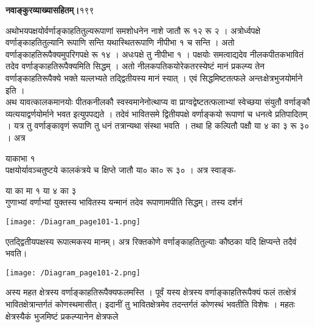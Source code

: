 \documentclass[11pt, openany]{book}
\begin{document}
\onehalfspacing
\hspace{2in}\textbf{नवाङ्कुरव्याख्यासहितम्।}\hspace{2in}१९९ 

\vspace{5mm}
\begin{sloppypar}
\hangindent=0.2in \hspace{0.2in}अथोभयपक्षयोर्वर्णाङ्काहतितुल्यरूपाणां समशोधनेन नाशे जातौ रू १२ रू २ । अत्रोर्ध्वपक्षे वर्णाङ्काहतितुल्यानि रूपाणि सन्ति यथास्थितरूपाणि नीपीभा १ च सन्ति । अतो वर्णाङ्काहतिरूपैक्यमुपरिगपक्षे रू १४ । अधःपक्षे तु नीपीभा १ । पक्षयोः समत्वाद्यदेव नीलकपीतकभावितं तदेव वर्णाङ्काहतिरूपैक्यमिति सिद्धम् । अतो नीलकपतिकयोरेकतरस्येष्टं मानं प्रकल्प्य तेन वर्णाङ्काहतिरूपैक्ये भक्ते यल्लभ्यते तद्द्वितीयस्य मानं स्यात् । एवं सिद्धमिष्टतत्फले अन्तःक्षेत्रभुजयोर्माने इति ।\\

\hangindent=0.2in \hspace{0.2in}अथ यावत्कालकमानयोः पीतकनीलकौ स्वस्वमानेनोत्थाप्य वा प्राग्वद्वेष्टतत्फलाभ्यां स्वेच्छया संयुतौ वर्णाङ्कौ व्यत्ययाद्वर्णयोर्माने भवत इत्युपपद्यते । तदेवं भावितसमे द्वितीयपक्षे वर्णाङ्कयो रूपाणां च धनत्वे प्रतिपादितम् । यत्र तु वर्णाङ्कावृणं रूपाणि तु धनं तत्रान्यथा संस्था भवति । तथा हि कल्पितौ पक्षौ या ४ का ३ रू ३० । अत्र 

\hspace{1.5in}याकाभा १\\

\hangindent=0.2in पक्षयोर्यावञ्चतुष्टये कालकंत्रये च क्षिप्ते जातौ या० का० रू ३० । अत्र स्वाङ्क- 

\hspace{2.75in}या का मा १ या ४ का ३\\

\hangindent=0.2in \hspace{0.2in}गुणाभ्यां वर्णाभ्यां युक्तस्य भावितस्य यन्मानं तदेव रूपाणामपीति सिद्धम्। तस्य दर्शनं 

\begin{center}
\hspace{0.2in}\texttt{[image: /Diagram\_page101-1.png]}
\end{center}

\hangindent=0.2in \hspace{0.2in}एतद्द्वितीयपक्षस्य रूपात्मकस्य मानम्। अत्र रिक्तकोणे वर्णाङ्काहतितुल्याः कौष्ठका यदि क्षिप्यन्ते तदैवं भवति।

\begin{center}
\hspace{0.2in}\texttt{[image: /Diagram\_page101-2.png]}
\end{center}

\hangindent=0.2in \hspace{0.2in}अस्य महत क्षेत्रस्य वर्णाङ्काहतिरूपैक्यफलमस्ति । पूर्वं यस्य क्षेत्रस्य वर्णाङ्काहतिरूपैक्यं फलं तत्क्षेत्रं भावितक्षेत्रान्तर्गतं कोणस्थमासीत्। इदानीं तु भावितक्षेत्रमेव तदन्तर्गतं कोणस्थं भवतीति विशेषः । महतः क्षेत्रस्यैकं भुजमिष्टं प्रकल्प्यानेन क्षेत्रफले
\end{sloppypar}
\thispagestyle{empty}
\newpage
\end{document}
